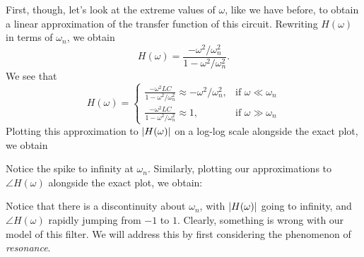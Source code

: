 \documentclass[letterpaper]{article}
\theoremstyle{remark}
\DeclarePairedDelimiter\abs{\lvert}{\rvert}%
\begin{document}
First, though, let's look at the extreme values of $\omega$, like we have before, to obtain a linear approximation of the transfer function of this circuit. Rewriting $H(\omega)$ in terms of $\omega_n$, we obtain
\[
    H(\omega) = \frac{-\omega^2 / \omega_n^2}{1 - \omega^2 / \omega_n^2}.
\]
We see that
\[
    H(\omega) =
    \begin{cases}
        \frac{-\omega^2LC}{1 - \omega^2 / \omega_n^2} \approx -\omega^2 / \omega_n^2, & \text{if } \omega \ll \omega_n \\
        \frac{-\omega^2LC}{1 - \omega^2 / \omega_n^2} \approx 1,   & \text{if } \omega \gg \omega_n
    \end{cases}
\]
Plotting this approximation to $\abs{H(\omega)}$ on a log-log scale alongside the exact plot, we obtain
\begin{center}
\end{center}
Notice the spike to infinity at $\omega_n$. Similarly, plotting our approximations to $\angle{H(\omega)}$ alongside the exact plot, we obtain:
\begin{center}
\end{center}
Notice that there is a discontinuity about $\omega_n$, with $\abs{H(\omega)}$ going to infinity, and $\angle{H(\omega)}$ rapidly jumping from $-1$ to $1$. Clearly, something is wrong with our model of this filter. We will address this by first considering the phenomenon of \emph{resonance}.
\end{document}

